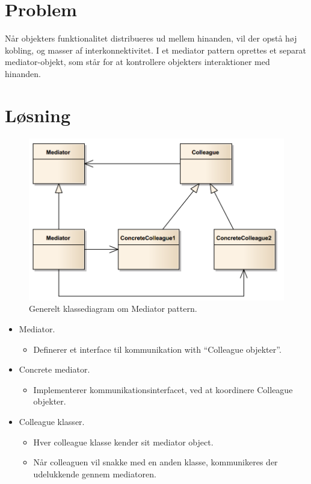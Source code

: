 \section{Problem}
Når objekters funktionalitet distribueres ud mellem hinanden, vil der opstå høj kobling, og masser af interkonnektivitet.  I et mediator pattern oprettes et separat mediator-objekt, som står for at kontrollere objekters interaktioner med hinanden. 

\section{Løsning}

\begin{figure}[h]
	\centering
	\includegraphics[width=\linewidth]{figs/concrete}
	\caption{Generelt klassediagram om Mediator pattern.}
	\label{fig:concrete}
\end{figure}

\begin{itemize}
	\item Mediator.
	\begin{itemize}
		\item 	Definerer et interface til kommunikation with “Colleague objekter”.
	\end{itemize}
	\item Concrete mediator.
	\begin{itemize}
		\item 	Implementerer kommunikationsinterfacet, ved at koordinere Colleague objekter.
	\end{itemize}
	\item Colleague klasser.
	\begin{itemize}
		\item Hver colleague klasse kender sit mediator object.
		\item Når colleaguen vil snakke med en anden klasse, kommunikeres der udelukkende gennem mediatoren.
	\end{itemize}
\end{itemize}

